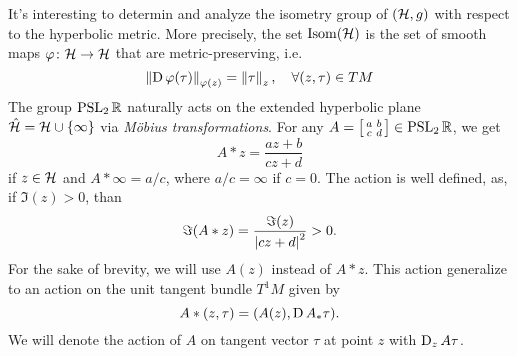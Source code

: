 It's interesting to determin and analyze the isometry group of $(\mathcal{H},g)$ with respect to the hyperbolic metric. More precisely, the set $\mathrm{Isom}(\mathcal{H})$ is the set of smooth maps $\varphi\colon\mathcal{H}\to\mathcal{H}$ that are metric-preserving, i.e. 
\[
\left\lVert \operatorname{D}\varphi(\tau)\right\rVert_{\varphi(z)}=\left\lVert \tau\right\rVert_{z},\quad\forall(z,\tau)\in TM
\]
The group $\operatorname{PSL}_{2}\mathbb{R}$ naturally acts on the extended hyperbolic plane $\hat{\mathcal{H}}=\mathcal{H}\cup\{\infty\}$ via \emph{M{\" o}bius transformations}. For any $A=\left[\begin{smallmatrix} a&b\\c&d \end{smallmatrix}\right]\in\operatorname{PSL}_{2}\mathbb{R}$, we get 
\[
A\ast z=\frac{az+b}{cz+d}
\]
if $z\in\mathcal{H}$ and $A\ast\infty=a/c$, where $a/c=\infty$ if $c=0$. The action is well defined, as, if $\Im(z)>0$, than 
\[
\Im(A\ast z)=\frac{\Im(z)}{\left| cz+d\right|^{2}}>0.
\]
For the sake of brevity, we will use $A(z)$ instead of $A\ast z$. This action generalize to an action on the unit tangent bundle $T^{1}M$ given by
\[
A\ast(z,\tau)=(A(z),\operatorname{D} A_{\ast}\tau).
\]
We will denote the action of $A$ on tangent vector $\tau$ at point $z$ with $\operatorname{D}_{z} A\tau$.\\

